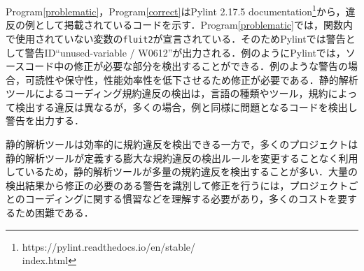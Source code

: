 \documentclass[T,J]{fose} %
\begin{document}
Program\ref{problematic}，Program\ref{correct}はPylint 2.17.5 documentation\footnote{https://pylint.readthedocs.io/en/stable/\\index.html}から，違反の例として掲載されているコードを示す．Program\ref{problematic}では，関数内で使用されていない変数の{\verb|fluit2|}が宣言されている．そのためPylintでは警告として警告ID``unused-variable / W0612''が出力される．例のようにPylintでは，ソースコード中の修正が必要な部分を検出することができる．例のような警告の場合，可読性や保守性，性能効率性を低下させるため修正が必要である．静的解析ツールによるコーディング規約違反の検出は，言語の種類やツール，規約によって検出する違反は異なるが，多くの場合，例と同様に問題となるコードを検出し警告を出力する．

静的解析ツールは効率的に規約違反を検出できる一方で，多くのプロジェクトは静的解析ツールが定義する膨大な規約違反の検出ルールを変更することなく利用しているため，静的解析ツールが多量の規約違反を検出することが多い\cite{UsingStaticAnalysisTools2}．大量の検出結果から修正の必要のある警告を識別して修正を行うには，プロジェクトごとのコーディングに関する慣習などを理解する必要があり，多くのコストを要するため困難である．



\end{document}
